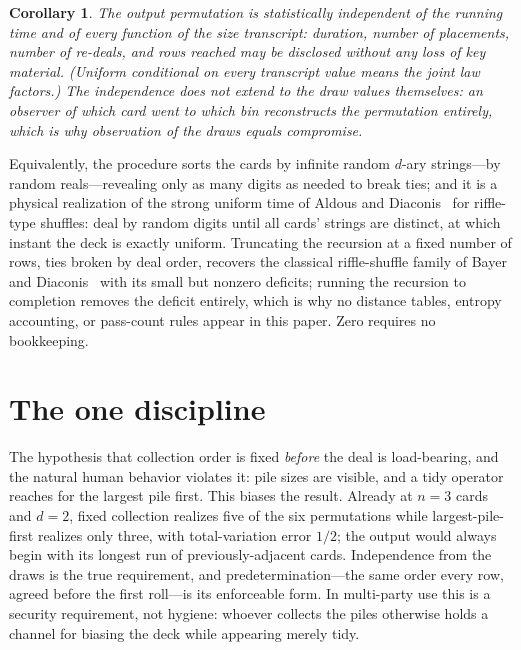 \documentclass[11pt]{article}
\newtheorem{corollary}[theorem]{Corollary}
\begin{document}
\begin{corollary}
The output permutation is statistically independent of the running
time and of every function of the size transcript: duration, number of
placements, number of re-deals, and rows reached may be disclosed
without any loss of key material. (Uniform conditional on every
transcript value means the joint law factors.) The independence does
not extend to the draw values themselves: an observer of which card
went to which bin reconstructs the permutation entirely, which is why
observation of the draws equals compromise.
\end{corollary}

Equivalently, the procedure sorts the cards by infinite random $d$-ary
strings---by random reals---revealing only as many digits as needed to
break ties; and it is a physical realization of the strong uniform time
of Aldous and Diaconis~\cite{AD86} for riffle-type shuffles: deal by
random digits until all cards' strings are distinct, at which instant
the deck is exactly uniform. Truncating the recursion at a fixed number
of rows, ties broken by deal order, recovers the classical
riffle-shuffle family of Bayer and Diaconis~\cite{BD92} with its small
but nonzero deficits; running the recursion to completion removes the
deficit entirely, which is why no distance tables, entropy accounting,
or pass-count rules appear in this paper. Zero requires no
bookkeeping.

\section{The one discipline}

The hypothesis that collection order is fixed \emph{before} the deal is
load-bearing, and the natural human behavior violates it: pile sizes are
visible, and a tidy operator reaches for the largest pile first. This
biases the result. Already at $n = 3$ cards and $d = 2$, fixed
collection realizes five of the six permutations while
largest-pile-first realizes only three, with total-variation error
$1/2$; the output would always begin with its longest run of
previously-adjacent cards. Independence from the draws is the true
requirement, and predetermination---the same order every row, agreed
before the first roll---is its enforceable form. In multi-party use this
is a security requirement, not hygiene: whoever collects the piles
otherwise holds a channel for biasing the deck while appearing merely
tidy.
\end{document}
